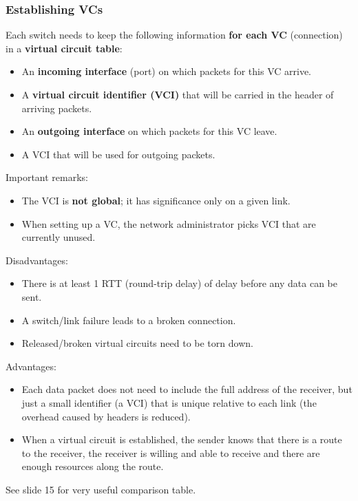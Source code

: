 \documentclass{article}%
\begin{document}
\subsubsection{Establishing VCs}
\label{sec:org03a67ce}
Each switch needs to keep the following information \textbf{for each VC} (connection) in a \textbf{virtual circuit table}:
\begin{itemize}
\item An \textbf{incoming interface} (port) on which packets for this VC arrive.
\item A \textbf{virtual circuit identifier (VCI)} that will be carried in the header of arriving packets.
\item An \textbf{outgoing interface} on which packets for this VC leave.
\item A VCI that will be used for outgoing packets.
\end{itemize}
Important remarks:
\begin{itemize}
\item The VCI is \textbf{not global}; it has significance only on a given link.
\item When setting up a VC, the network administrator picks VCI that are currently unused.
\end{itemize}
Disadvantages:
\begin{itemize}
\item There is at least 1 RTT (round-trip delay) of delay before any data can be sent.
\item A switch/link failure leads to a broken connection.
\item Released/broken virtual circuits need to be torn down.
\end{itemize}
Advantages:
\begin{itemize}
\item Each data packet does not need to include the full address of the receiver, but just a small identifier (a VCI) that is unique relative to each link (the overhead caused by headers is reduced).
\item When a virtual circuit is established, the sender knows that there is a route to the receiver, the receiver is willing and able to receive and there are enough resources along the route.
\end{itemize}
See slide 15 for very useful comparison table.
\end{document}
